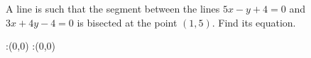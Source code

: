 
%
%
%
%      
% 
% 
%   

  \renewcommand{\vbone}{5}
  \renewcommand{\vbtwo}{-}
  \renewcommand{\vbthree}{+4}
  \renewcommand{\vbfour}{3}
  \renewcommand{\vbfive}{+4}
  \renewcommand{\vbsix}{-4}

\question[4]  A line is such that the segment between the lines 
$\vbone x\vbtwo y\vbthree=0$ and $\vbfour x\vbfive y\vbsix=0$ is 
bisected at the point $(1,5)$. Find its equation.


\ifprintanswers
  \begin{marginfigure}
      :(0,0)
      :(0,0)
    \figdrawbegin{}
      \figdrawline [100,101]
    \figdrawend
    \figvisu{\figBoxA}{}{%
    }
    \centerline{\box\figBoxA}
  \end{marginfigure}
\fi 

